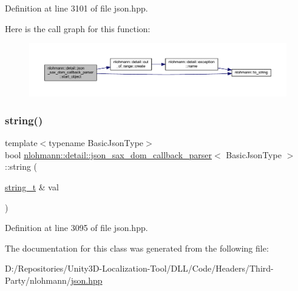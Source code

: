 Definition at line 3101 of file json.\+hpp.

Here is the call graph for this function\+:
\nopagebreak
\begin{figure}[H]
\begin{center}
\leavevmode
\includegraphics[width=350pt]{classnlohmann_1_1detail_1_1json__sax__dom__callback__parser_a040e60243cc7c18a6078c6b83cdb4a81_cgraph}
\end{center}
\end{figure}
\mbox{\label{classnlohmann_1_1detail_1_1json__sax__dom__callback__parser_ad94e912a67c7b96158937236805b8b47}} 
\subsubsection{\texorpdfstring{string()}{string()}}
{\footnotesize\ttfamily template$<$typename Basic\+Json\+Type$>$ \\
bool \mbox{\hyperlink{classnlohmann_1_1detail_1_1json__sax__dom__callback__parser}{nlohmann\+::detail\+::json\+\_\+sax\+\_\+dom\+\_\+callback\+\_\+parser}}$<$ Basic\+Json\+Type $>$\+::string (\begin{DoxyParamCaption}\item[{\mbox{\hyperlink{classnlohmann_1_1detail_1_1json__sax__dom__callback__parser_a00e7d95d82d5d8a43421526a42a8eabc}{string\+\_\+t}} \&}]{val }\end{DoxyParamCaption})\hspace{0.3cm}{\ttfamily [inline]}}



Definition at line 3095 of file json.\+hpp.



The documentation for this class was generated from the following file\+:\begin{DoxyCompactItemize}
\item 
D\+:/\+Repositories/\+Unity3\+D-\/\+Localization-\/\+Tool/\+D\+L\+L/\+Code/\+Headers/\+Third-\/\+Party/nlohmann/\mbox{\hyperlink{json_8hpp}{json.\+hpp}}\end{DoxyCompactItemize}
